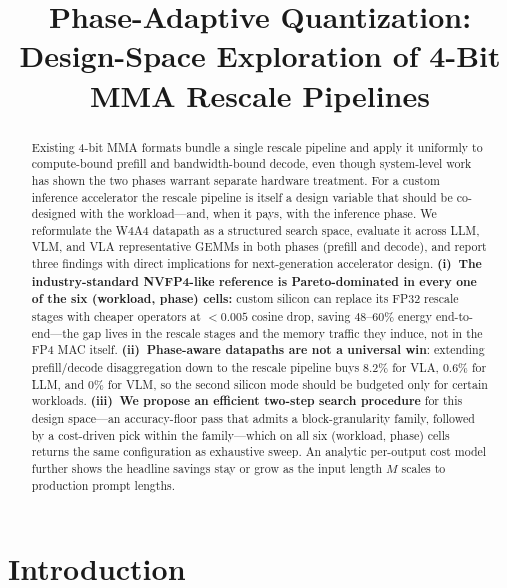 \documentclass[conference]{IEEEtran}
\begin{document}
\title{Phase-Adaptive Quantization:\\
Design-Space Exploration of 4-Bit MMA Rescale Pipelines}

\author{
\and
{}
}

\maketitle

\begin{abstract}
Existing 4-bit MMA formats bundle a single rescale pipeline and
apply it uniformly to compute-bound prefill and bandwidth-bound
decode, even though system-level work has shown the two phases
warrant separate hardware treatment.  For a custom inference
accelerator the rescale pipeline is itself a design variable that
should be co-designed with the workload---and, when it pays, with
the inference phase.  We reformulate the W4A4 datapath as a
structured search space, evaluate it across LLM, VLM, and VLA representative GEMMs in both
phases (prefill and decode), and report three
findings with direct implications for next-generation accelerator
design.  \textbf{(i)~The industry-standard NVFP4-like reference is
Pareto-dominated in every one of the six (workload, phase) cells:}
custom silicon can replace its FP32 rescale stages with cheaper
operators at $<\!0.005$ cosine drop, saving $48$--$60\%$ energy
end-to-end---the gap lives in the rescale stages and the memory
traffic they induce, not in the FP4 MAC itself.  \textbf{(ii)~Phase-aware datapaths are not a
universal win}: extending prefill/decode disaggregation down to
the rescale pipeline buys $8.2\%$ for VLA, $0.6\%$ for LLM, and
$0\%$ for VLM, so the second silicon mode
should be budgeted only for certain workloads.  \textbf{(iii)~We propose an efficient two-step search procedure} for this
design space---an accuracy-floor pass that admits a
block-granularity family, followed by a cost-driven pick within
the family---which on all six (workload, phase) cells returns
the same configuration as exhaustive sweep.  An analytic per-output cost model further
shows the headline savings stay or grow as the input length $M$
scales to production prompt lengths.
\end{abstract}

\section{Introduction}
\label{sec:intro}
\end{document}
